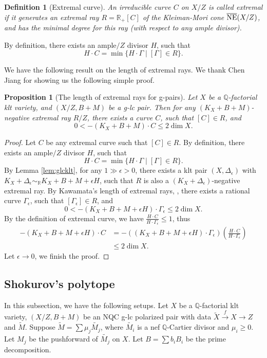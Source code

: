 \documentclass[11pt]{amsart}
\newcommand{\Rr}{\mathbb{R}}
\newcommand{\Qq}{\mathbb{Q}}
\newtheorem{proposition}[theorem]{Proposition}
\newtheorem{definition}[theorem]{Definition}
\begin{document}
\begin{definition}[Extremal curve]\label{def: extremal curve}
	An irreducible curve $C$ on $X/Z$ is called \emph{extremal} if it generates an extremal ray $R = \Rr_+[C]$ of the Kleiman-Mori cone $\overline{\rm NE}(X/Z)$, and has the minimal degree for this ray (with respect to any ample divisor).
\end{definition}

By definition, there exists an ample$/Z$ divisor $H$, such that 
\[
H \cdot C = \min\{H\cdot\Gamma \mid [\Gamma]\in R\}.
\] 

We have the following result on the length of extremal rays. We thank Chen Jiang for showing us the following simple proof. 
\begin{proposition}[The length of extremal rays for g-pairs]\label{prop: length of extremal rays for g-pair}
	Let $X$ be a $\Qq$-factorial klt variety, and $(X/Z,B+M)$ be a g-lc pair. Then for any $(K_X+B+M)$-negative extremal ray $R/Z$, there exists a curve $C$, such that $[C]\in R$, and $$0<-(K_X+B+M)\cdot C \leq 2\dim X.$$
\end{proposition}
 
\begin{proof}
	Let $C$ be any extremal curve such that $[C]\in R$. By definition, there exists an ample$/Z$ divisor $H$, such that 
	\[
	H \cdot C = \min\{H\cdot\Gamma \mid [\Gamma]\in R\}.
	\]
	By Lemma \ref{lem:glcklt}, for any $1 \gg \epsilon>0$, there exists a klt pair $(X, \Delta_\epsilon)$ with $K_X+\Delta_\epsilon \sim_\Rr K_X+B+M+\epsilon H$, such that $R$ is also a $(K_X+\Delta_\epsilon)$-negative extremal ray. By Kawamata's length of extremal rays, \cite{Kawamata91}, there exists a rational curve $\Gamma_\epsilon$, such that $[\Gamma_\epsilon]\in R$, and
	$$0<-(K_X+B+M+\epsilon H) \cdot \Gamma_\epsilon \leq 2\dim X.$$ 
	By the definition of extremal curve, we have $\frac{H \cdot C}{H \cdot \Gamma_{\epsilon}} \leq 1$, thus
	\begin{align*}
	-(K_X+B+M+\epsilon H) \cdot C &= -((K_X+B+M+\epsilon H) \cdot \Gamma_\epsilon )(\frac{H \cdot C}{H \cdot \Gamma_{\epsilon}})\\
	& \leq 2\dim X.
	\end{align*}
	Let $\epsilon \to 0$, we finish the proof.
\end{proof}

\subsection{Shokurov's polytope}\label{subsection: Shokurov polytope} In this subsection, we have the following setups. Let $X$ be a $\Qq$-factorial klt variety, $(X/Z, B + M)$ be an NQC g-lc polarized pair with data $\tilde X \xrightarrow{f} X \to Z$ and $\tilde M$. Suppose $\tilde M=\sum \mu_j \tilde{M_j}$, where $\tilde{M_i}$ is a nef $\Qq$-Cartier divisor and $\mu_i\ge 0$. Let $M_j$ be the pushforward of $\tilde{M_j}$ on $X$. Let $B=\sum b_iB_i$ be the prime decomposition.  
\end{document}
